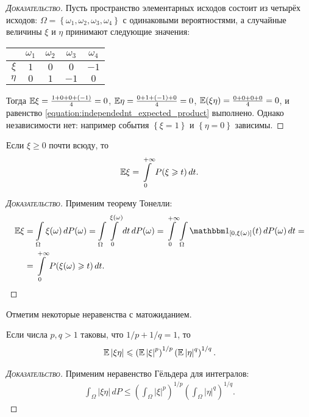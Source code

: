 \documentclass[../main.tex]{subfiles}
\begin{document}
\begin{proof}[\normalfont\textsc{Доказательство}]
 Пусть пространство элементарных исходов состоит из четырёх исходов: $ \Omega = \left\{ \omega_1, \omega_2, \omega_3, \omega_4 \right\} $ с одинаковыми вероятностями, а случайные величины $ \xi $ и $ \eta $ принимают следующие значения:
 \begin{center}
  \begin{tabular}{r|cccc}
   & $\omega_1$ & $\omega_2$ & $\omega_3$ & $\omega_4$ \\
   \hline
   $\xi$ & $ 1 $ & $0$ & $0$ & $-1$ \\
   $\eta$ & $0$ & $1$ & $-1$ & $0$
  \end{tabular}
 \end{center}
 Тогда  $ \mathbb E \xi = \frac{1 + 0 + 0 + (-1)}{4} = 0 $, $ \mathbb E\eta = \frac{0 + 1 + (-1) + 0}{4} = 0 $, $ \mathbb E (\xi \eta) = \frac{0 + 0 + 0 + 0}{4} = 0 $, и равенство \eqref{equation:independednt_expected_product} выполнено. Однако независимости нет: например события $ \left\{ \xi=1 \right\} $ и $ \left\{ \eta = 0 \right\} $ зависимы.
\end{proof}

\begin{prop}
 Если $ \xi \geqslant 0 $ почти всюду, то
 \begin{align*}
  \mathbb E\xi = \int\limits_{0}^{+\infty} P(\xi \geqslant t)\,dt.
 \end{align*} 
\end{prop}
\begin{proof}[\normalfont\textsc{Доказательство}]
 Применим теорему Тонелли:
 \begin{align*}
  \E\xi &= \int\limits_{\Omega} \xi(\omega)\,dP(\omega) = \int\limits_{\Omega} \int\limits_{0}^{\xi(\omega)} dt\,dP(\omega) = \int\limits_{0}^{+\infty} \int\limits_{\Omega}   \Ind_{[0, \xi(\omega)]}(t)\,dP(\omega)\,dt = \\
  &= \int\limits_{0}^{+\infty} P(\xi(\omega) \geqslant t)\,dt.
 \end{align*} 
\end{proof}

Отметим некоторые неравенства с матожиданием.

\begin{prop}
 \label{proposition:gulder_inequality}
 Если числа $ p, q > 1 $ таковы, что $ 1/p+1/q = 1 $, то
 \begin{align}
  \label{equation:holder_inequality}
  \mathbb E\left|\xi\eta\right| \leqslant \left( \mathbb E \left| \xi \right|^{p} \right)^{1/p} \left( \mathbb E \left| \eta \right|^{q} \right)^{1/q}.
 \end{align} 
\end{prop}
\begin{proof}[\normalfont\textsc{Доказательство}]
 Применим неравенство Гёльдера для интегралов:
 \begin{align*}
  \int_{\Omega} \left|\xi \eta \right|\,dP \leqslant \left( \int_{\Omega} \left| \xi \right|^{p}  \right)^{1 / p} \left( \int_{\Omega} \left| \eta \right|^{q}  \right)^{1 / q}.
 \end{align*}
\end{proof}
\end{document}
